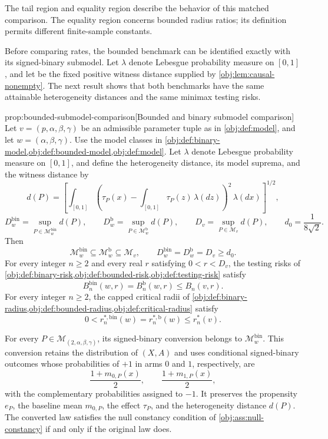 The tail region  and equality region  describe the behavior of this matched comparison. The equality region concerns bounded radius ratios; its definition permits different finite-sample constants.

Before comparing rates, the bounded benchmark can be identified exactly with its signed-binary submodel. Let \(\lambda\) denote Lebesgue probability measure on \([0,1]\), and let  be the fixed positive witness distance supplied by \cref{obj:lem:causal-nonempty}. The next result shows that both benchmarks have the same attainable heterogeneity distances and the same minimax testing risks.

\begin{propositionv}{prop:bounded-submodel-comparison}[Bounded and binary submodel comparison]
Let \(v=(p,\alpha,\beta,\gamma)\) be an admissible parameter tuple as in \cref{obj:def:model}, and let \(w=(\alpha,\beta,\gamma)\). Use the model classes in \cref{obj:def:binary-model,obj:def:bounded-model,obj:def:model}. Let \(\lambda\) denote Lebesgue probability measure on \([0,1]\), and define the heterogeneity distance, its model suprema, and the witness distance by
\[
d(P)=
\left[
\int_{[0,1]}
\left(\tau_P(x)-\int_{[0,1]}\tau_P(z)\,\lambda(dz)\right)^2
\,\lambda(dx)
\right]^{1/2},
\]
\[
D_w^{\mathrm{bin}}=\sup_{P\in\mathcal M^{\mathrm{bin}}_w}d(P),
\qquad
D_w^{\mathrm b}=\sup_{P\in\mathcal M^{\mathrm b}_w}d(P),
\qquad
D_v=\sup_{P\in\mathcal M_v}d(P),
\qquad
d_0=\frac{1}{8\sqrt{2}}.
\]
Then
\[
\mathcal M^{\mathrm{bin}}_w\subseteq\mathcal M^{\mathrm b}_w
\subseteq\mathcal M_v,
\qquad
D_w^{\mathrm{bin}}=D_w^{\mathrm b}=D_v\ge d_0.
\]
For every integer \(n\ge2\) and every real \(r\) satisfying \(0<r<D_v\), the testing risks of \cref{obj:def:binary-risk,obj:def:bounded-risk,obj:def:testing-risk} satisfy
\[
B_n^{\mathrm{bin}}(w,r)=B_n^{\mathrm b}(w,r)\le B_n(v,r).
\]
For every integer \(n\ge2\), the capped critical radii of \cref{obj:def:binary-radius,obj:def:bounded-radius,obj:def:critical-radius} satisfy
\[
0<r_n^{*,\mathrm{bin}}(w)
=r_n^{*,\mathrm b}(w)\le r_n^*(v).
\]

For every \(P\in\mathcal M_{(2,\alpha,\beta,\gamma)}\), its signed-binary conversion belongs to \(\mathcal M^{\mathrm{bin}}_w\). This conversion retains the distribution of \((X,A)\) and uses conditional signed-binary outcomes whose probabilities of \(+1\) in arms \(0\) and \(1\), respectively, are
\[
\frac{1+m_{0,P}(x)}{2},
\qquad
\frac{1+m_{1,P}(x)}{2},
\]
with the complementary probabilities assigned to \(-1\). It preserves the propensity \(e_P\), the baseline mean \(m_{0,P}\), the effect \(\tau_P\), and the heterogeneity distance \(d(P)\). The converted law satisfies the null constancy condition of \cref{obj:ass:null-constancy} if and only if the original law does.


\end{propositionv}
